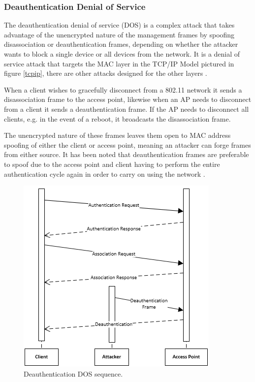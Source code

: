 \subsubsection{Deauthentication Denial of Service}
\label{ddos-atk}
The deauthentication denial of service (DOS) \cite{research:disassoc_atk} is a complex attack that takes advantage of the unencrypted nature of the management frames by spoofing disassociation or deauthentication frames, depending on whether the attacker wants to block a single device or all devices from the network. It is a denial of service attack that targets the MAC layer in the TCP/IP Model pictured in figure \ref{tcpip}, there are other attacks designed for the other layers \cite{research:layer_flood}.

When a client wishes to gracefully disconnect from a 802.11 network it sends a disassociation frame \cite{research:80211_disassoc_frame} to the access point, likewise when an AP needs to disconnect from a client it sends a deauthentication \cite{research:80211_deauth_frame} frame. If the AP needs to disconnect all clients, e.g. in the event of a reboot, it broadcasts the disassociation frame. 

The unencrypted nature of these frames leaves them open to MAC address spoofing of either the client or access point, meaning an attacker can forge frames from either source. It has been noted that deauthentication frames are preferable to spoof due to the access point and client having to perform the entire authentication cycle again in order to carry on using the network \cite{research:defending_auth}.

\begin{figure}[htbp!]
\centering\includegraphics{research/attackvectors/figures/ddos.png}
\caption{Deauthentication DOS sequence.}
\end{figure}

